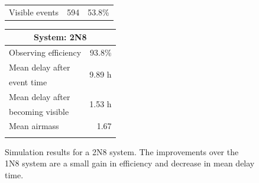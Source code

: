 \begin{colsection}
\begin{colsection}
\begin{figure}[p]
\begin{center}
\begin{minipage}[t]{0.37\textwidth}
\begin{tabular}{lrr}
                \midrule
                Visible events & 594 &  53.8\% \\
            \end{tabular}
        \end{minipage}
        \begin{minipage}[t]{0.35\textwidth}\vspace{0pt}
            \begin{tabular}{lr}
                \multicolumn{2}{c}{\textbf{System: 2N8}} \\
                \midrule
                Observing efficiency & 93.8\% \\
                \midrule
                Mean delay after     & \multirow{2}{*}{9.89 h} \\
                event time           & \\
                Mean delay after     & \multirow{2}{*}{1.53 h} \\
                becoming visible     & \\
                \midrule
                Mean airmass         & 1.67 \\
                & \\
            \end{tabular}
        \end{minipage}
    \end{center}
    \caption[GW simulation results: 2N8 system]{
        Simulation results for a 2N8 system. The improvements over the 1N8 system are a small gain in efficiency and decrease in mean delay time.
    }\label{fig:gw_sim_2n8}
\end{figure}

\newpage


\end{colsection}
\end{colsection}
